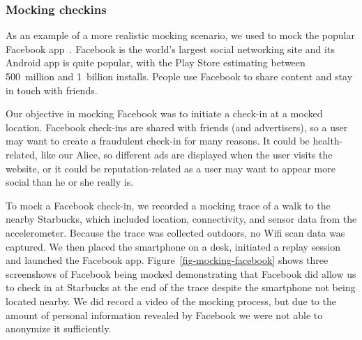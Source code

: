 \subsubsection{Mocking checkins}

As an example of a more realistic mocking scenario, we used \PocketMocker{}
to mock the popular Facebook app~\cite{facebook-playstore-url}. Facebook is
the world's largest social networking site and its Android app is quite
popular, with the Play Store estimating between 500~million and 1~billion
installs. People use Facebook to share content and stay in touch with
friends.

Our objective in mocking Facebook was to initiate a check-in at a mocked
location. Facebook check-ins are shared with friends (and advertisers), so a
user may want to create a fraudulent check-in for many reasons. It could be
health-related, like our Alice, so different ads are displayed when the user
visits the website, or it could be reputation-related as a user may want to
appear more social than he or she really is.

To mock a Facebook check-in, we recorded a mocking trace of a walk to the
nearby Starbucks, which included location, connectivity, and sensor data from
the accelerometer. Because the trace was collected outdoors, no Wifi scan
data was captured. We then placed the smartphone on a desk, initiated a
replay session and launched the Facebook app.
Figure~\ref{fig-mocking-facebook} shows three screenshows of Facebook being
mocked demonstrating that Facebook did allow us to check in at Starbucks at
the end of the trace despite the smartphone not being located nearby. We did
record a video of the mocking process, but due to the amount of personal
information revealed by Facebook we were not able to anonymize it
sufficiently.

